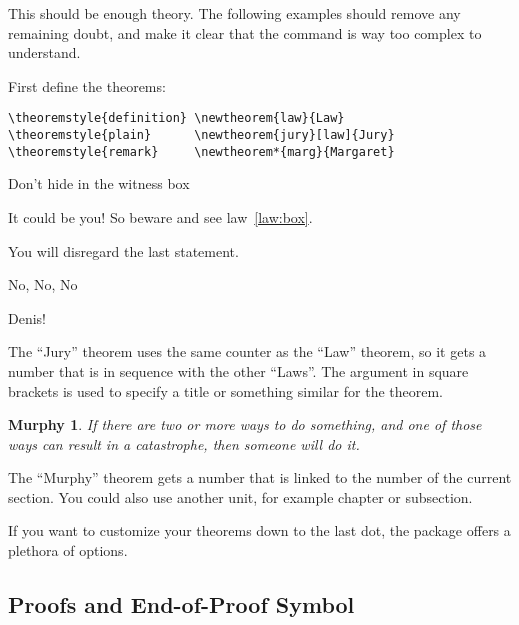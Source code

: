 This should be enough theory. The following examples should
remove any remaining doubt, and make it clear that the
 command is way too complex to understand.

First define the theorems:

\begin{verbatim}
\theoremstyle{definition} \newtheorem{law}{Law}
\theoremstyle{plain}      \newtheorem{jury}[law]{Jury}
\theoremstyle{remark}     \newtheorem*{marg}{Margaret}
\end{verbatim}

\begin{example}
\begin{law}\label{law:box}
Don't hide in the witness box
\end{law}
\begin{jury}
It could be you! So beware and
see law~\ref{law:box}.\end{jury}
\begin{jury}
You will disregard the last
statement.\end{jury}
\begin{marg}No, No, No\end{marg}
\begin{marg}Denis!\end{marg}
\end{example}

The ``Jury'' theorem uses the same counter as the ``Law''
theorem, so it gets a number that is in sequence with
the other ``Laws''. The argument in square brackets is used to specify
a title or something similar for the theorem.
\begin{example}[examplewidth=0.45\linewidth]
\newtheorem{mur}{Murphy}[section]

\begin{mur} If there are two or 
more ways to do something, and 
one of those ways can result in
a catastrophe, then someone 
will do it.\end{mur}
\end{example}

The ``Murphy'' theorem gets a number that is linked to the number of
the current section. You could also use another unit, for example chapter or
subsection.

If you want to customize your theorems down to the last dot, the
 package offers a plethora of options.

\subsection{Proofs and End-of-Proof Symbol}\label{sec:putting-qed-right}

